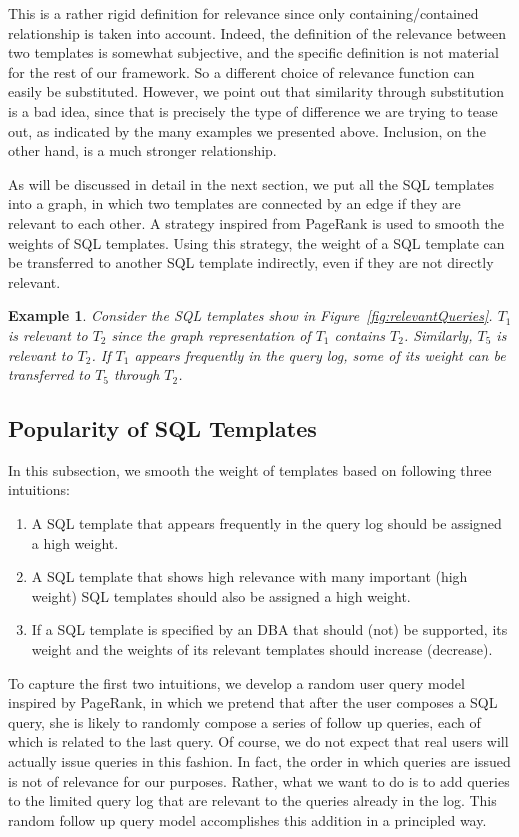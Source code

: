 \documentclass{vldb}
\newtheorem{example}{Example}
\begin{document}
This is a rather rigid definition for relevance since only containing/contained relationship is taken into account.  
Indeed, the definition of the relevance between two templates is somewhat subjective, and the specific definition is not material for the rest of our framework.  So a different choice of relevance function can easily be substituted.  However, we point out that similarity through substitution is a bad idea, since that is precisely the type of difference we are trying to tease out, as indicated by the many examples we presented above.  Inclusion, on the other hand, is a much stronger relationship.

As will be discussed in detail in the next section, we put all the SQL templates into a graph, in which two templates are connected by an edge if they are relevant to each other.  A strategy inspired from PageRank is used to smooth the weights of SQL templates.  Using this strategy, the weight of a SQL template can be transferred to another SQL template indirectly, even if they are not directly relevant.
\begin{example}
Consider the SQL templates show in Figure~\ref{fig:relevantQueries}.  $T_1$ is relevant to $T_2$ since the graph representation of $T_1$ contains $T_2$.  Similarly, $T_5$ is relevant to $T_2$.  If $T_1$ appears frequently in the query log, some of its weight can be transferred to $T_5$ through $T_2$.   
\end{example}

\subsection{Popularity of SQL Templates}
\label{subsec:popularity}

In this subsection, we smooth the weight of templates based on following three intuitions:
\begin{enumerate}
  \item A SQL template that appears frequently in the query log should be assigned a high weight.
  \item A SQL template that shows high relevance with many important (high weight) SQL templates should also be assigned a high weight.
  \item If a SQL template is specified by an DBA that should (not) be supported, its weight and the weights of its relevant templates should increase (decrease).
\end{enumerate}

To capture the first two intuitions, we develop a random user query model inspired by PageRank, in which we pretend that after the user composes a SQL query, she is likely to randomly compose a series of follow up queries, each of which is related to the last query.  Of course, we do not expect that real users will actually issue queries in this fashion. In fact, the order in which queries are issued is not of relevance for our purposes.  Rather, what we want to do is to add queries to the limited query log that are relevant to the queries already in the log.  This random follow up query model accomplishes this addition in a principled way.
\end{document}
